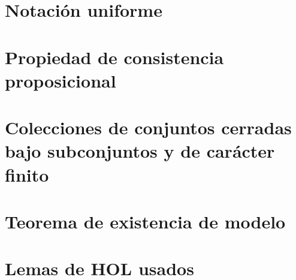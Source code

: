 \documentclass[12pt,a4paper,twoside]{book}
\begin{document}
\chapter{Notación uniforme}


\chapter{Propiedad de consistencia proposicional}


\chapter{Colecciones de conjuntos cerradas bajo subconjuntos y de carácter finito}


\chapter{Teorema de existencia de modelo}


\appendix
\chapter{Lemas de HOL usados}


\nocite{fitting1996first,LMF,CC,articulo,escribir,tutorial,main,isar,implementation,intro,gamut,modal,proofsystems,automatic,coq}


\end{document}
